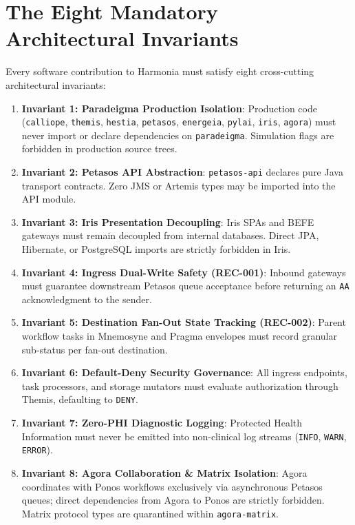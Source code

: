 \section{The Eight Mandatory Architectural Invariants}

Every software contribution to Harmonia must satisfy eight cross-cutting architectural invariants:

\begin{enumerate}
    \item \textbf{Invariant 1: Paradeigma Production Isolation}: Production code (\nolinkurl{calliope}, \nolinkurl{themis}, \nolinkurl{hestia}, \nolinkurl{petasos}, \nolinkurl{energeia}, \nolinkurl{pylai}, \nolinkurl{iris}, \nolinkurl{agora}) must never import or declare dependencies on \nolinkurl{paradeigma}. Simulation flags are forbidden in production source trees.
    \item \textbf{Invariant 2: Petasos API Abstraction}: \nolinkurl{petasos-api} declares pure Java transport contracts. Zero JMS or Artemis types may be imported into the API module.
    \item \textbf{Invariant 3: Iris Presentation Decoupling}: Iris SPAs and BEFE gateways must remain decoupled from internal databases. Direct JPA, Hibernate, or PostgreSQL imports are strictly forbidden in Iris.
    \item \textbf{Invariant 4: Ingress Dual-Write Safety (REC-001)}: Inbound gateways must guarantee downstream Petasos queue acceptance before returning an \nolinkurl{AA} acknowledgment to the sender.
    \item \textbf{Invariant 5: Destination Fan-Out State Tracking (REC-002)}: Parent workflow tasks in Mnemosyne and Pragma envelopes must record granular sub-status per fan-out destination.
    \item \textbf{Invariant 6: Default-Deny Security Governance}: All ingress endpoints, task processors, and storage mutators must evaluate authorization through Themis, defaulting to \nolinkurl{DENY}.
    \item \textbf{Invariant 7: Zero-PHI Diagnostic Logging}: Protected Health Information must never be emitted into non-clinical log streams (\nolinkurl{INFO}, \nolinkurl{WARN}, \nolinkurl{ERROR}).
    \item \textbf{Invariant 8: Agora Collaboration \& Matrix Isolation}: Agora coordinates with Ponos workflows exclusively via asynchronous Petasos queues; direct dependencies from Agora to Ponos are strictly forbidden. Matrix protocol types are quarantined within \nolinkurl{agora-matrix}.
\end{enumerate}

